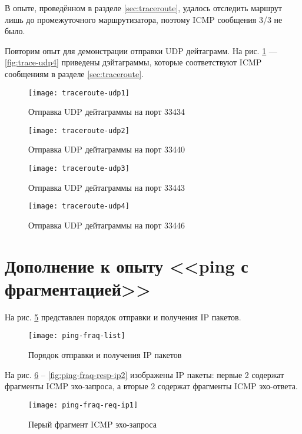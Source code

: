 В опыте, проведённом в разделе \ref{sec:traceroute}, удалось отследить маршрут лишь до промежуточного маршрутизатора, поэтому ICMP сообщения 3/3 не было.

Повторим опыт для демонстрации отправки UDP дейтаграмм. На рис. \ref{fig:trace-udp1} --- \ref{fig:trace-udp4} приведены дэйтаграммы, которые соответствуют ICMP сообщениям в разделе \ref{sec:traceroute}. 

\begin{figure}[H]
	\centering
	\texttt{[image: traceroute-udp1]}
	\caption{Отправка  UDP дейтаграммы на порт 33434}
	\label{fig:trace-udp1}
\end{figure}

\begin{figure}[H]
	\centering
	\texttt{[image: traceroute-udp2]}
	\caption{Отправка  UDP дейтаграммы на порт 33440}
	\label{fig:trace-udp2}
\end{figure}

\begin{figure}[H]
	\centering
	\texttt{[image: traceroute-udp3]}
	\caption{Отправка  UDP дейтаграммы на порт 33443}
	\label{fig:trace-udp3}
\end{figure}

\begin{figure}[H]
	\centering
	\texttt{[image: traceroute-udp4]}
	\caption{Отправка  UDP дейтаграммы на порт 33446}
	\label{fig:trace-udp3}
\end{figure}

\section{Дополнение к опыту <<ping с фрагментацией>>}

На рис. \ref{fig:ping-list} представлен порядок отправки и получения IP пакетов.

\begin{figure}[H]
	\centering
	\texttt{[image: ping-fraq-list]}
	\caption{Порядок отправки и получения IP пакетов}
	\label{fig:ping-list}
\end{figure}

На рис. \ref{fig:ping-fraq-req-ip1} -- \ref{fig:ping-fraq-resp-ip2} изображены IP пакеты: первые 2 содержат фрагменты ICMP эхо-запроса, а вторые 2 содержат фрагменты ICMP эхо-ответа.

\begin{figure}[H]
	\centering
	\texttt{[image: ping-fraq-req-ip1]}
	\caption{Перый фрагмент ICMP эхо-запроса}
	\label{fig:ping-fraq-req-ip1}
\end{figure}


